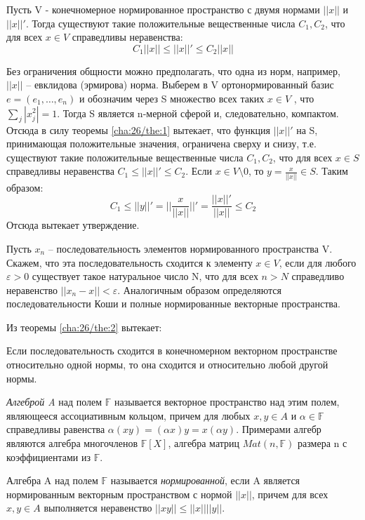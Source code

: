 \begin{theorem}[]\label{cha:26/the:2}
	Пусть V - конечномерное нормированное пространство с двумя нормами $||x||$ и $||x||'$. Тогда существуют такие положительные вещественные числа $C_1,C_2$, что для всех $x \in V$ справедливы неравенства:
	$$C_1 ||x|| \le ||x||' \le C_2 ||x||$$
\end{theorem}
\begin{Proof}
	Без ограничения общности можно предполагать, что одна из норм, например, $||x||$ – евклидова (эрмирова) норма. Выберем в V ортонормированный базис $e = (e_1, \dots, e_n)$ и обозначим через S множество всех таких $x \in V$ , что $\underset{j}{\overset{}{\sum}} |x_j^2 | = 1$. Тогда S является n-мерной сферой и, следовательно, компактом. Отсюда в силу теоремы \ref{cha:26/the:1} вытекает, что функция $||x||'$ на S, принимающая положительные значения, ограничена сверху и снизу, т.е. существуют такие положительные вещественные числа $C_1,C_2$, что для всех $x \in S$ справедливы неравенства $C_1 \le ||x||' \le C_2$. Если $x \in V \setminus 0$, то $y = \frac{x}{||x||} \in S$. Таким образом:
	$$C_1 \le ||y||' = \Big| \Big| \frac{x}{||x||} \Big| \Big|' = \frac{||x||'}{||x||} \le C_2$$
	Отсюда вытекает утверждение.
\end{Proof}

Пусть $x_n$ – последовательность элементов нормированного пространства V. Скажем, что эта последовательность сходится к элементу $x \in V$, если для любого $\varepsilon > 0$ существует такое натуральное число N, что для всех $n > N$ справедливо неравенство $||x_n - x|| < \varepsilon$. Аналогичным образом определяются последовательности Коши и полные нормированные векторные пространства.

Из теоремы \ref{cha:26/the:2} вытекает:
\begin{conseq}[]\label{cha:26/conseq:1}
	Если последовательность сходится в конечномерном векторном пространстве относительно одной нормы, то она сходится и относительно любой другой нормы.
\end{conseq}

\textit{Алгеброй A} над полем $\mathbb{F}$ называется векторное пространство над этим полем, являющееся ассоциативным кольцом, причем для любых $x, y \in A$ и $\alpha \in \mathbb{F}$ справедливы равенства $\alpha(xy) = (\alpha x)y = x(\alpha y)$. Примерами алгебр являются алгебра многочленов $\mathbb{F}[X]$, алгебра матриц $Mat(n, \mathbb{F})$ размера n с коэффициентами из $\mathbb{F}$.

Алгебра A над полем $\mathbb{F}$ называется \textit{нормированной}, если A является нормированным векторным пространством с нормой $||x||$, причем для всех $x, y \in A$ выполняется неравенство $||xy|| \le ||x|| ||y||$.

